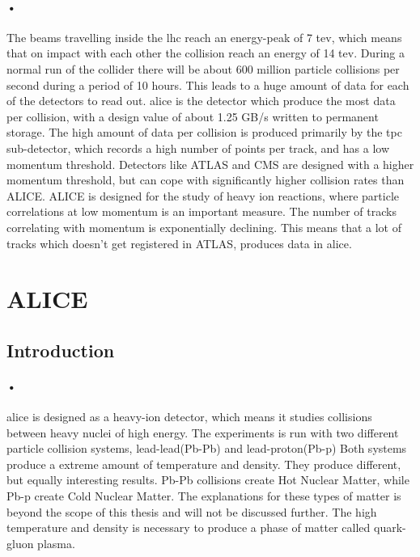 \documentclass[a4paper, 12pt]{report}
\begin{document}
\paragraph{•}
The beams travelling inside the \gls{lhc} reach an energy-peak of 7 \gls{tev}, which means that on impact with each other the collision reach an energy of 14 \gls{tev}\cite{lhc-pdf}.
During a normal run of the collider there will be about 600 million particle collisions per second during a period of 10 hours.
This leads to a huge amount of data for each of the detectors to read out.
\gls{alice} is the detector which produce the most data per collision, with a design value of about 1.25 GB/s written to permanent storage.
The high amount of data per collision is produced primarily by the \gls{tpc} sub-detector, which records a high number of points per track, and has a low momentum threshold. Detectors like ATLAS and CMS  are designed with a higher momentum threshold, but can cope with significantly higher collision rates than ALICE.
ALICE is designed for the study of heavy ion reactions, where particle correlations at low momentum is an important measure.
The number of tracks correlating with momentum is exponentially declining.
This means that a lot of tracks which doesn't get registered in ATLAS, produces data in \gls{alice}.

\section{ALICE}
\subsection{Introduction}

\paragraph{•}
\gls{alice} is designed as a heavy-ion detector, which means it studies collisions between heavy nuclei of high energy\cite{alice-home}.
The experiments is run with two different particle collision systems, lead-lead(Pb-Pb) and lead-proton(Pb-p)
Both systems produce a extreme amount of temperature and density.
They produce different, but equally interesting results.
Pb-Pb collisions create Hot Nuclear Matter, while Pb-p create Cold Nuclear Matter.
The explanations for these types of matter is beyond the scope of this thesis and will not be discussed further.
The high temperature and density is necessary to produce a phase of matter called quark-gluon plasma.
\end{document}
